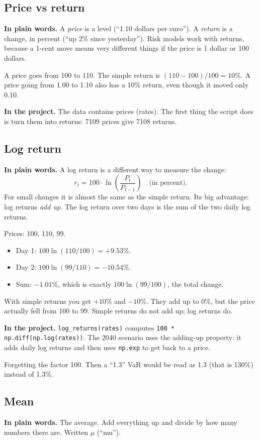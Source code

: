 \documentclass[11pt,a4paper]{article}
\newcommand{\term}[1]{\subsection{#1}}
\newcommand{\plain}{\textbf{In plain words.} }
\newcommand{\inproj}{\textbf{In the project.} }
\newcommand{\code}[1]{\texttt{#1}}
\begin{document}
\term{Price vs return}\label{g:return}
\plain A \emph{price} is a level (``1.10 dollars per euro''). A
\emph{return} is a change, in percent (``up 2\% since yesterday''). Risk
models work with returns, because a 1-cent move means very different things
if the price is 1 dollar or 100 dollars.

\begin{example}
A price goes from 100 to 110. The simple return is
$(110-100)/100 = 10\%$. A price going from 1.00 to 1.10 also has a 10\%
return, even though it moved only 0.10.
\end{example}

\inproj The data contains prices (rates). The first thing the script does is
turn them into returns: 7109 prices give 7108 returns.

\term{Log return}\label{g:logreturn}
\plain A log return is a different way to measure the change:
\[
  r_t = 100 \cdot \ln\!\left(\frac{P_t}{P_{t-1}}\right) \quad \text{(in percent).}
\]
For small changes it is almost the same as the simple return. Its big
advantage: log returns \emph{add up}. The log return over two days is the
sum of the two daily log returns.

\begin{example}
Prices: 100, 110, 99.
\begin{itemize}
  \item Day 1: $100\ln(110/100) = +9.53\%$.
  \item Day 2: $100\ln(99/110) = -10.54\%$.
  \item Sum: $-1.01\%$, which is exactly $100\ln(99/100)$, the total change.
\end{itemize}
With simple returns you get $+10\%$ and $-10\%$. They add up to $0\%$, but
the price actually fell from 100 to 99. Simple returns do not add up; log
returns do.
\end{example}

\inproj \code{log\_returns(rates)} computes
\code{100 * np.diff(np.log(rates))}. The 2040 scenario uses the adding-up
property: it adds daily log returns and then uses \code{np.exp} to get back
to a price.

\begin{mistake}
Forgetting the factor 100. Then a ``1.3'' VaR would be read as 1.3 (that is
130\%) instead of 1.3\%.
\end{mistake}

\term{Mean}\label{g:mean}
\plain The average. Add everything up and divide by how many numbers there
are. Written $\mu$ (``mu'').
\end{document}
